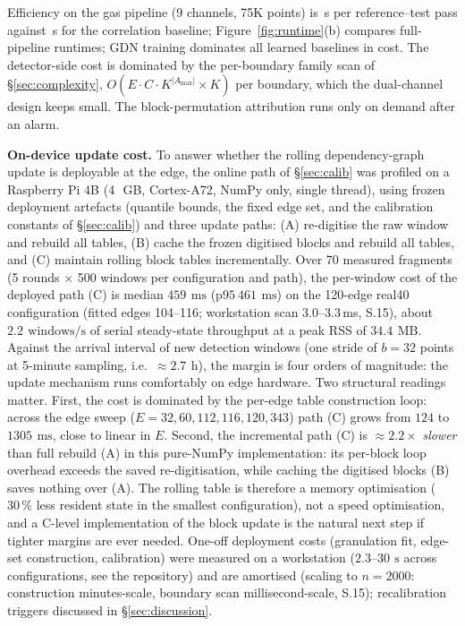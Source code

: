 \documentclass[11pt,a4paper]{article}
\begin{document}
Efficiency on the gas pipeline (9 channels, 75K points) is \eSevenOurs{}\,s
per reference--test pass against \eSevenCorr{}\,s for the correlation
baseline; Figure~\ref{fig:runtime}(b) compares full-pipeline runtimes;
GDN training dominates all learned baselines in cost. The detector-side cost is dominated by the per-boundary
family scan of \S\ref{sec:complexity}, $O(E\cdot C\cdot K^{|A_{\max}|}\times K)$ per
boundary, which the
dual-channel design keeps small. The block-permutation attribution runs
only on demand after an alarm.

\textbf{On-device update cost.} To answer whether the rolling dependency-graph
update is deployable at the edge, the online path of \S\ref{sec:calib} was
profiled on a Raspberry Pi 4B (4\,~GB, Cortex-A72, NumPy only, single thread),
using frozen deployment artefacts (quantile bounds, the fixed edge set, and
the calibration constants of \S\ref{sec:calib}) and three update paths: (A)
re-digitise the raw window and rebuild all tables, (B) cache the frozen
digitised blocks and rebuild all tables, and (C) maintain rolling block
tables incrementally. Over 70 measured fragments (5 rounds $\times$ 500
windows per configuration and path), the per-window cost of the deployed
path (C) is
median $459\,~\mathrm{ms}$ ($\mathrm{p95}~461\,~\mathrm{ms}$) on the 120-edge
real40 configuration (fitted edges 104--116; workstation scan
$3.0$--$3.3$\,ms, S.15), about $2.2\,~\mathrm{windows/s}$
of serial steady-state throughput at a peak RSS of $34.4\,~\mathrm{MB}$. Against the arrival interval
of new detection windows (one stride of $b=32$ points at 5-minute
sampling, i.e.\ $\approx 2.7\,~\mathrm{h}$), the margin is four orders of
magnitude: the update
mechanism runs comfortably on edge hardware. Two structural readings
matter. First, the cost is dominated by the per-edge table construction
loop: across the edge sweep ($E=32,60,112,116,120,343$) path (C) grows
from $124$ to $1305\,~\mathrm{ms}$, close to linear in $E$. Second, the
incremental path (C) is $\approx 2.2\times$ \emph{slower} than full rebuild
(A) in this pure-NumPy implementation: its per-block loop overhead exceeds
the saved re-digitisation, while caching the digitised blocks (B) saves
nothing over (A). The rolling table is therefore a memory optimisation
($30\,\%$ less resident state in the smallest configuration), not a speed
optimisation, and a C-level implementation of the block update is the
natural next step if tighter margins are ever needed. One-off deployment
costs (granulation fit, edge-set construction, calibration) were measured
on a workstation ($2.3$--$30\,~\mathrm{s}$ across configurations, see the
repository) and are amortised (scaling to $n{=}2000$: construction
minutes-scale, boundary scan millisecond-scale, S.15); recalibration
triggers discussed in
\S\ref{sec:discussion}.
\end{document}
